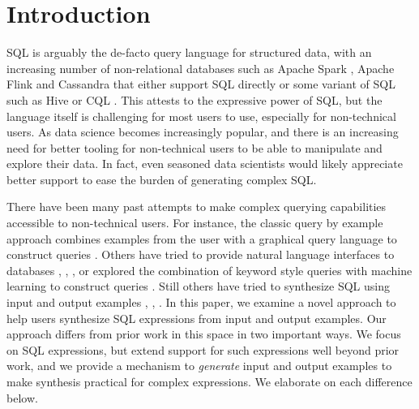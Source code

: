 \section{Introduction}

SQL is arguably the de-facto query language for structured data, with an increasing number of non-relational databases such as Apache Spark \cite{Apache_Spark}, Apache Flink \cite{Apache_Flink} and Cassandra \cite{Cassandra} that either support SQL directly or some variant of SQL such as Hive \cite{Hive} or CQL \cite{CQL}. This attests to the expressive power of SQL, but the language itself is challenging for most users to use, especially for non-technical users.  As data science becomes increasingly popular, and there is an increasing need for better tooling for non-technical users to be able to manipulate and explore their data.  In fact, even seasoned data scientists would likely appreciate better support to ease the burden of generating complex SQL.

There have been many past attempts to make complex querying capabilities accessible to non-technical users.  For instance, the classic query by example approach combines examples from the user with a graphical query language to construct queries \cite{Zloof}.  Others have tried to provide natural language interfaces to databases \cite{Fei-Li}, \cite{Androutsopoulos}, \cite{Seq2SQL}, or explored the combination of keyword style queries with machine learning to construct queries \cite{Bergamaschi}.  Still others have tried to synthesize SQL using input and output examples \cite{BodikPLDI}, \cite{BodikSIGMOD}, \cite{Zhang}.  In this paper, we examine a novel approach to help users synthesize SQL expressions from input and output examples.  Our approach differs from prior work in this space in two important ways.  We focus on SQL expressions, but extend support for such expressions well beyond prior work, and we provide a mechanism to \emph{generate} input and output examples to make synthesis practical for complex expressions.  We elaborate on each difference below.

